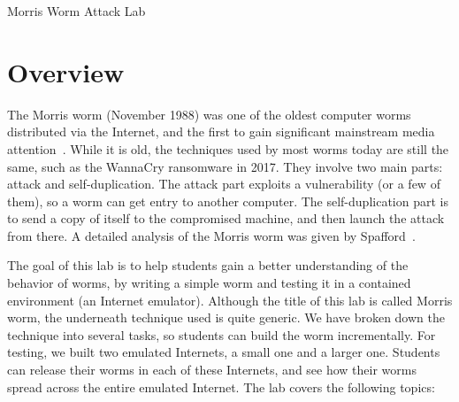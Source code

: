 
\newcommand{\commonfolder}{../../common-files}




\newcommand{\wormFigs}{./Figs}


\usepackage{hyperref}




\begin{center}
{\LARGE Morris Worm Attack Lab}
\end{center}




\section{Overview}

The Morris worm (November 1988) was one of the oldest computer worms
distributed via the Internet, and the first to gain significant 
mainstream media attention~\cite{wiki:worm}. 
While it is old, the techniques
used by most worms today are still the same, such as 
the WannaCry ransomware in 2017. 
They involve two main 
parts: attack and self-duplication. The attack part exploits 
a vulnerability (or a few of them), so a worm can get entry
to another computer.
The self-duplication part
is to send a copy of itself to the compromised machine,
and then launch the attack from there.
A detailed analysis of the Morris worm was given by Spafford~\cite{spafford:worm}.

The goal of this lab is 
to help students gain a better understanding of the behavior of worms,
by writing a simple worm and testing it in a contained environment (an Internet emulator).
Although the title of this lab is called Morris worm,
the underneath technique used is quite generic. 
We have broken down the technique into several tasks, so students
can build the worm incrementally. For testing, we built two
emulated Internets, a small one and a larger one. Students can release
their worms in each of these Internets, and see how their worms 
spread across the entire emulated Internet. 
The lab covers the following topics:


